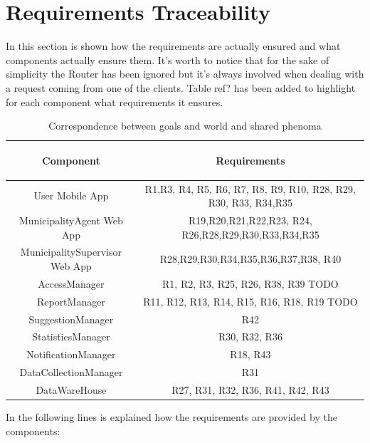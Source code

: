 \documentclass[a4paper]{report}
\begin{document}
\chapter{Requirements Traceability}

In this section is shown how the requirements are actually ensured and what components actually ensure them. It's worth to notice that for the sake of simplicity the Router has been ignored but it's always involved when dealing with a request coming from one of the clients. 
Table ref? has been added to highlight for each component what requirements it ensures.
\begin{table}[H]  
  \centering
  \begin{tabular}{|c|c|}
    \cline{1-2}
   	\rule{0pt}{10pt} 
   	\begin{large}
    \textbf{Component} 
    \end{large}&\begin{large}
    \textbf{Requirements} 
    \end{large}\\  \hline
    User Mobile App &  R1,R3, R4, R5, R6, R7, R8, R9, R10, R28, R29, R30, R33, R34,R35\\ \hline
    MunicipalityAgent Web App & R19,R20,R21,R22,R23, R24, R26,R28,R29,R30,R33,R34,R35 \\ \hline
    MunicipalitySupervisor Web App & R28,R29,R30,R34,R35,R36,R37,R38, R40 \\ \hline
    AccessManager & R1, R2, R3, R25, R26, R38, R39 TODO \\ \hline
    ReportManager & R11, R12, R13, R14, R15, R16, R18, R19 TODO \\ \hline
    SuggestionManager & R42 \\ \hline
    StatisticsManager & R30, R32, R36 \\ \hline
    NotificationManager & R18, R43 \\ \hline
    DataCollectionManager & R31 \\ \hline
    DataWareHouse & R27, R31, R32, R36, R41, R42, R43 \\ \hline
    
  \end{tabular}
  \caption{Correspondence between goals and world and shared phenoma}
\end{table}
In the following lines is explained how the requirements are provided by the components:
\end{document}
